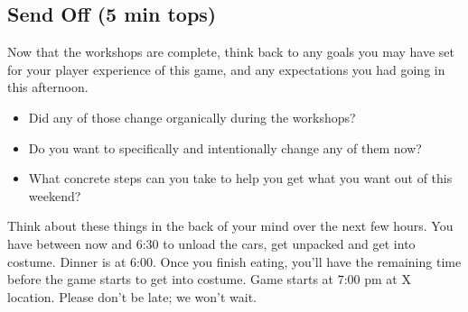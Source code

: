 \documentclass[green]{GL2020}
\begin{document}
\subsection*{Send Off (5 min tops)}
Now that the workshops are complete, think back to any goals you may have set for your player experience of this game, and any expectations you had going in this afternoon. 
\begin{itemize}
	\item Did any of those change organically during the workshops? 
	\item Do you want to specifically and intentionally change any of them now? 
	\item What concrete steps can you take to help you get what you want out of this weekend?
\end{itemize}

Think about these things in the back of your mind over the next few hours. You have between now and 6:30 to unload the cars, get unpacked and get into costume. Dinner is at 6:00. Once you finish eating, you’ll have the remaining time before the game starts to get into costume. Game starts at 7:00 pm at X location. Please don’t be late; we won’t wait.
\end{document}
